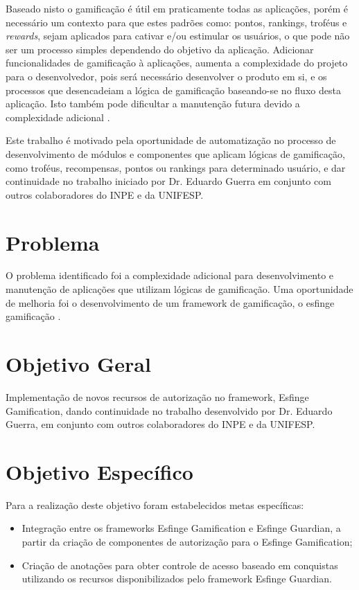 \par Baseado nisto o gamificação é útil em praticamente todas as aplicações, porém é necessário um contexto para que estes padrões como: pontos, rankings, troféus e \textit{rewards}, sejam aplicados para cativar e/ou estimular os usuários, o que pode não ser um processo simples dependendo do objetivo da aplicação. Adicionar funcionalidades de gamificação à aplicações, aumenta a complexidade do projeto para o desenvolvedor, pois será necessário desenvolver o produto em si, e os processos que desencadeiam a lógica de gamificação baseando-se no fluxo desta aplicação. Isto também pode dificultar a manutenção futura devido a complexidade adicional \cite{guerra2017approach}.

\par Este trabalho é motivado pela oportunidade de automatização no processo de desenvolvimento de módulos e componentes que aplicam lógicas de gamificação, como troféus, recompensas, pontos ou rankings para determinado usuário, e dar continuidade no trabalho iniciado por Dr. Eduardo Guerra em conjunto com outros colaboradores do INPE e da UNIFESP.

\section{Problema}

\par O problema identificado foi a complexidade adicional para desenvolvimento e manutenção de aplicações que utilizam lógicas de gamificação. Uma oportunidade de melhoria foi o desenvolvimento de um framework de gamificação, o esfinge gamificação \cite{guerra2017approach}.

\section{Objetivo Geral}

\par Implementação de novos recursos de autorização no framework, Esfinge Gamification, dando continuidade no trabalho desenvolvido por Dr. Eduardo Guerra, em conjunto com outros colaboradores do INPE e da UNIFESP. 

\section{Objetivo Espec\'ifico}

\par Para a realização deste objetivo foram estabelecidos metas específicas:
\begin{itemize}
    \item Integração entre os frameworks Esfinge Gamification e Esfinge Guardian, a partir da criação de componentes de autorização para o Esfinge Gamification;
    \item Criação de anotações para obter controle de acesso baseado em conquistas utilizando os recursos disponibilizados pelo framework Esfinge Guardian.
\end{itemize}

